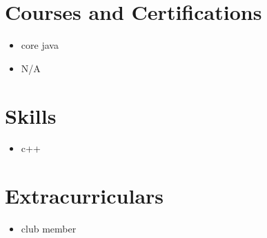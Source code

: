 \documentclass[a4paper, 12pt]{article}
\begin{document}
    \section*{Courses and Certifications}
    \begin{itemize}
        \item core java
        \item N/A
    \end{itemize}

    \section*{Skills}
    \begin{itemize}
        \item c++
    \end{itemize}

    \section*{Extracurriculars}
    \begin{itemize}
        \item club member
    \end{itemize}

    
\end{document}
